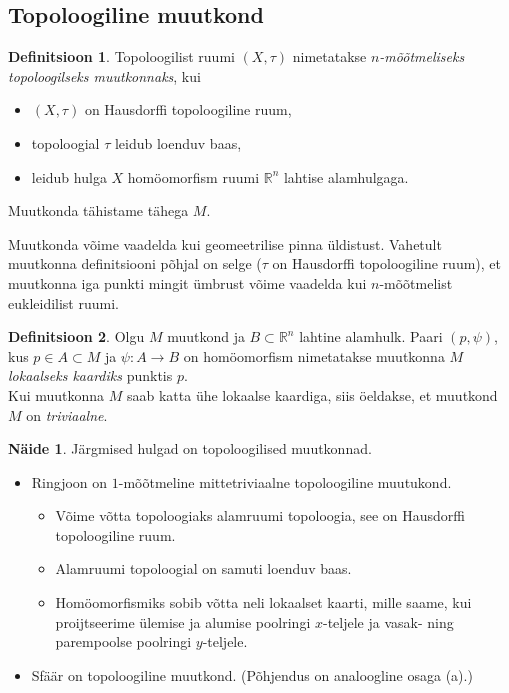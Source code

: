 \documentclass[a4paper,12pt]{article}
\theoremstyle{plain}
\theoremstyle{definition}
\newtheorem{definitsioon}{Definitsioon}[section]
\newtheorem{naide}{Näide}[section]
\numberwithin{equation}{section}
\def\R{{\mathbb R}}
\begin{document}
\subsection{Topoloogiline muutkond}

\begin{definitsioon}
Topoloogilist ruumi $\left(X, \tau\right)$ nimetatakse \emph{$n$-mõõtmeliseks topoloogilseks muutkonnaks}, kui
\begin{itemize}
\item[1)] $\left(X, \tau\right)$ on Hausdorffi topoloogiline ruum,
\item[2)] topoloogial $\tau$ leidub loenduv baas,
\item[3)] leidub hulga $X$ homöomorfism ruumi $\R^n$ lahtise alamhulgaga.
\end{itemize}
Muutkonda tähistame tähega $M$.
\end{definitsioon}

Muutkonda võime vaadelda kui geomeetrilise pinna üldistust. Vahetult muutkonna definitsiooni põhjal on selge ($\tau$ on Hausdorffi topoloogiline ruum), et muutkonna iga punkti mingit ümbrust võime vaadelda kui $n$-mõõtmelist eukleidilist ruumi.

\begin{definitsioon}
Olgu $M$ muutkond ja $B \subset \R^n$ lahtine alamhulk. Paari $\left(p, \psi\right)$, kus $p \in A \subset M$ ja $\psi : A \rightarrow B$ on homöomorfism nimetatakse muutkonna $M$ \emph{lokaalseks kaardiks} punktis $p$.\\
Kui muutkonna $M$ saab katta ühe lokaalse kaardiga, siis öeldakse, et muutkond $M$ on \emph{triviaalne}.
\end{definitsioon}

\begin{naide}
Järgmised hulgad on topoloogilised muutkonnad.
\begin{itemize}
\item[(a)] Ringjoon on $1$-mõõtmeline mittetriviaalne topoloogiline muutukond.
\begin{itemize}
\item[1)] Võime võtta topoloogiaks alamruumi topoloogia, see on Hausdorffi topoloogiline ruum.
\item[2)] Alamruumi topoloogial on samuti loenduv baas.
\item[3)] Homöomorfismiks sobib võtta neli lokaalset kaarti, mille saame, kui proijtseerime ülemise ja alumise poolringi $x$-teljele ja vasak- ning parempoolse poolringi $y$-teljele.
\end{itemize}
\item[(b)] Sfäär on topoloogiline muutkond. (Põhjendus on analoogline osaga (a).)
\end{itemize}
\end{naide}
\end{document}
